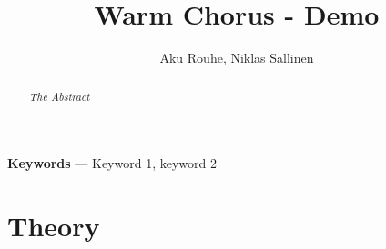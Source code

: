 \documentclass[11pt,a4paper,twoside]{article}
\title{Warm Chorus -  Demo}
\author{Aku Rouhe, Niklas Sallinen}
\begin{document}
\maketitle

\begin{abstract}
\noindent\it The Abstract
\end{abstract}

\noindent\textbf{Keywords} --- Keyword 1, keyword 2


\clearpage
\section{Theory}



\clearpage





\clearpage




\clearpage




\clearpage



\end{document}
